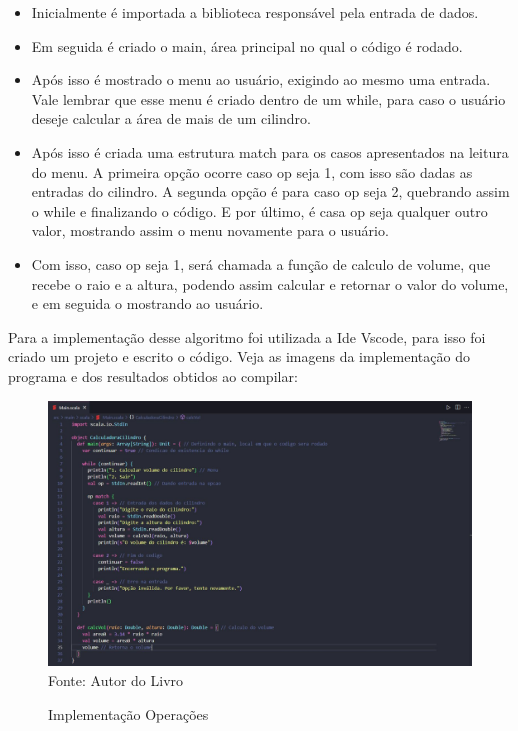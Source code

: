 	\begin{itemize}
		
		\item Inicialmente é importada a biblioteca responsável pela entrada de dados.
		
		\item Em seguida é criado o main, área principal no qual o código é rodado.
		
		\item Após isso é mostrado o menu ao usuário, exigindo ao mesmo uma entrada. Vale lembrar que esse menu é criado dentro de um while, para caso o usuário deseje calcular a área de mais de um cilindro.
		
		\item Após isso é criada uma estrutura match para os casos apresentados na leitura do menu. A primeira opção ocorre caso op seja 1, com isso são dadas as entradas do cilindro. A segunda opção é para caso op seja 2, quebrando assim o while e finalizando o código. E por último, é casa op seja qualquer outro valor, mostrando assim o menu novamente para o usuário.
		
		\item Com isso, caso op seja 1, será chamada a função de calculo de volume, que recebe o raio e a altura, podendo assim calcular e retornar o valor do volume, e em seguida o mostrando ao usuário. 
		
	\end{itemize}

	Para a implementação desse algoritmo foi utilizada a Ide Vscode, para isso foi criado um projeto e escrito o código. Veja as imagens da implementação do programa e dos resultados obtidos ao compilar:
	
	\begin{figure}[H]
		\centering
		\caption{Implementação Operações}
		\label{Implementação Operações}
		\includegraphics[width=17cm]{Pictures/Operac.jpg} \\
		Fonte: Autor do Livro
	\end{figure}

